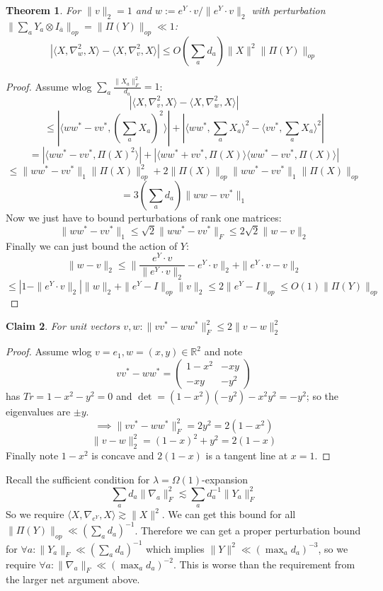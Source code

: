 \documentclass{article}
\newtheorem{theorem}{Theorem}
\newtheorem{claim}[theorem]{Claim}
\newcommand{\R}{{\mathbb{R}}}
\begin{document}
\begin{theorem}
For $\|v\|_{2} = 1$ and $w := e^{Y} \cdot v / \|e^{Y} \cdot v\|_{2}$ with perturbation $\|\sum_{a} Y_{a} \otimes I_{\overline{a}}\|_{op} = \|\Pi(Y)\|_{op} \ll 1$: 
\[ |\langle X, \nabla_{w}^{2}, X \rangle - \langle X, \nabla_{v}^{2}, X \rangle| \leq O(\sum_{a} d_{a}) \|X\|^{2} \|\Pi(Y)\|_{op}   \]
\end{theorem}
\begin{proof}
Assume wlog $\sum_{a} \frac{\|X_{a}\|_{F}^{2}}{d_{a}} = 1$:
\[ |\langle X, \nabla_{v}^{2}, X \rangle - \langle X, \nabla_{w}^{2}, X \rangle| \]
\[ \leq |\langle w w^{*} - v v^{*}, \left( \sum_{a} X_{a} \right)^{2} \rangle| + |\langle w w^{*}, \sum_{a} X_{a} \rangle^{2} - \langle v v^{*}, \sum_{a} X_{a} \rangle^{2}| \]
\[ = |\langle w w^{*} - v v^{*}, \Pi(X)^{2} \rangle| + |\langle w w^{*} + v v^{*}, \Pi(X) \rangle \langle w w^{*} - v v^{*}, \Pi(X) \rangle|    \]
\[ \leq \|w w^{*} - v v^{*}\|_{1} \|\Pi(X)\|_{op}^{2} + 2 \|\Pi(X)\|_{op} \|w w^{*} - v v^{*}\|_{1} \|\Pi(X)\|_{op}  \]
\[ = 3 (\sum_{a} d_{a}) \|w w - v v^{*}\|_{1}   \]
Now we just have to bound perturbations of rank one matrices:
\[ \|w w^{*} - v v^{*}\|_{1} \leq \sqrt{2} \|w w^{*} - v v^{*}\|_{F} \leq 2 \sqrt{2} \|w - v\|_{2}  \]
Finally we can just bound the action of $Y$:
\[ \|w - v\|_{2} \leq \|\frac{e^{Y} \cdot v}{\|e^{Y} \cdot v\|_{2}} - e^Y \cdot v\|_{2} + \|e^{Y} \cdot v - v\|_{2}  \]
\[ \leq |1 - \|e^{Y} \cdot v\|_{2}| \|w\|_{2} + \|e^{Y} - I\|_{op} \|v\|_{2} \leq 2 \|e^{Y} - I\|_{op} \leq O(1) \|\Pi(Y)\|_{op} \]
\end{proof}

\begin{claim}
For unit vectors $v,w: \|v v^{*} - w w^{*}\|_{F}^{2} \leq 2 \|v - w\|_{2}^{2}$
\end{claim}
\begin{proof}
Assume wlog $v = e_{1}, w = (x,y) \in \R^{2}$ and note
\[ v v^{*} - w w^{*} = \begin{pmatrix} 1 - x^{2} & -xy \\ -xy & -y^{2} \end{pmatrix}  \]
has $Tr = 1 - x^{2} - y^{2} = 0$ and $\det = (1-x^{2})(-y^{2}) - x^{2} y^{2} = - y^{2}$; so the eigenvalues are $\pm y$. 
\[ \implies \|v v^{*} - w w^{*}\|_{F}^{2} = 2 y^{2} = 2(1-x^{2}) \]
\[ \|v - w\|_{2}^{2} = (1-x)^{2} + y^{2} = 2(1-x) \]
Finally note $1 - x^{2}$ is concave and $2(1-x)$ is a tangent line at $x=1$. 
\end{proof}

Recall the sufficient condition for $\lambda = \Omega(1)$-expansion
\[ \sum_{a} d_{a} \|\nabla_{a}\|_{F}^{2} \lesssim \sum_{a} d_{a}^{-1} \|Y_{a}\|_{F}^{2}  \]
So we require $\langle X, \nabla_{e^{Y}}, X \rangle \gtrsim \|X\|^{2}$. We can get this bound for all $\|\Pi(Y)\|_{op} \ll (\sum_{a} d_{a})^{-1}$. Therefore we can get a proper perturbation bound for $\forall a: \|Y_{a}\|_{F} \ll (\sum_{a} d_{a})^{-1}$ which implies $\|Y\|^{2} \ll (\max_{a} d_{a})^{-3}$, so we require $\forall a: \|\nabla_{a}\|_{F} \ll (\max_{a} d_{a})^{-2}$. This is worse than the requirement from the larger net argument above. 
\end{document}
